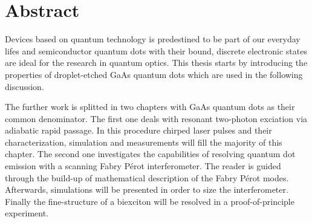 

\chapter*{Abstract}
\label{cha:abstract}

Devices based on quantum technology is predestined to be part of our everyday lifes and semiconductor quantum dots with their bound, discrete electronic states are ideal for the research in quantum optics.
This thesis starts by introducing the properties of droplet-etched GaAs quantum dots which are used in the following discussion. 

The further work is splitted in two chapters with GaAs quantum dots as their common denominator.
The first one deals with resonant two-photon exciation via adiabatic rapid passage.
In this procedure chirped laser pulses and their characterization, simulation and measurements will fill the majority of this chapter.
The second one investigates the capabilities of resolving quantum dot emission with a scanning Fabry Pérot interferometer.
The reader is guided through the build-up of mathematical description of the Fabry Pérot modes.
Afterwards, simulations will be presented in order to size the interferometer.
Finally the fine-structure of a biexciton will be resolved in a proof-of-principle experiment.

